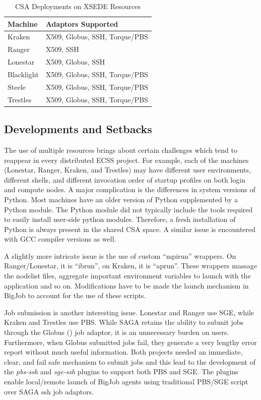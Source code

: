 \documentclass{sig-alternate}
\begin{document}
\begin{table}
\begin{center}
\begin{tabular}{ll}
\toprule
\textbf{Machine}  & 
\textbf{Adaptors Supported} 
\\ \midrule
Kraken   & 
X509, Globus, SSH, Torque/PBS
\\ \midrule
Ranger   & 
X509, SSH
\\ \midrule
Lonestar & 
X509, Globus, SSH
\\ \midrule
Blacklight & 
X509, Globus, SSH, Torque/PBS
\\ \midrule
Steele & 
X509, Globus, SSH, Torque/PBS
\\ \midrule
Trestles & 
X509, Globus, SSH, Torque/PBS
\\ \bottomrule
\end{tabular}
\caption{CSA Deployments on XSEDE Resources}
\label{table:CSA-Deployments}
\end{center}
\end{table}

\subsection{Developments and Setbacks}

The use of multiple resources brings about certain challenges which tend to reappear in 
every distributed ECSS project. For example, each of the machines (Lonestar, Ranger, 
Kraken, and Trestles) may have different user environments, different shells, and 
different invocation order of startup profiles on both login and compute nodes. A major 
complication is the differences in system versions of Python. Most machines have an older 
version of Python supplemented by a Python module. The Python module did not typically 
include the tools required to easily install user-side python modules. Therefore, a fresh 
installation of Python is always present in the shared CSA space. A similar issue is 
encountered with GCC compiler versions as well.

A slightly more intricate issue is the use of custom ``mpirun'' wrappers. On
Ranger/Lonestar, it is ``ibrun'', on Kraken, it is ``aprun''. These wrappers
massage the nodelist files, aggregate important environment variables to launch
with the application and so on. Modifications have to be made the launch
mechanism in BigJob to account for the use of these scripts.

Job submission is another interesting issue. Lonestar and Ranger use SGE, while
Kraken and Trestles use PBS. While SAGA retains the ability to submit jobs
through the Globus (\cite{Globus}) job adaptor, it is an unnecessary burden on
users. Furthermore, when Globus submitted jobs fail, they generate a very
lengthy error report without much useful information. Both projects needed an
immediate, clear, and fail safe mechanism to submit jobs and this lead to the
development of the \textit{pbs-ssh} and \textit{sge-ssh} plugins to support both
PBS and SGE. The plugins enable local/remote launch of BigJob agents using
traditional PBS/SGE script over SAGA ssh job adaptors.
\end{document}
